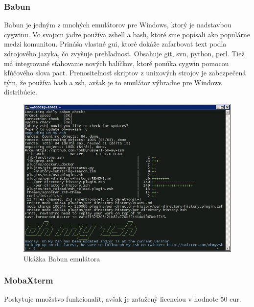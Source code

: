 \subsubsection{Babun}
\indent Babun je jedným z mnohých emulátorov pre Windows, ktorý je nadstavbou cygwinu. Vo svojom jadre používa zshell a bash, ktoré sme popísali ako populárne medzi komunitou. Prináša vlastné \acrshort{gui}, ktoré dokáže zafarbovať text podľa zdrojového jazyka, čo zvyšuje prehľadnosť. Obsahuje git, svn, python, perl. Tiež má integrované sťahovanie nových balíčkov, ktoré ponúka cygwin pomocou kľúčového slova pact. Prenositeľnosť skriptov z unixových strojov je zabezpečená tým, že používa bash a zsh, avšak je to emulátor výhradne pre Windows distribúcie.\cite{babun}
\begin{figure}[!htbp]
	\centering
	\includegraphics[scale=0.4]{img/babun.jpeg}
	\caption{Ukážka Babun emulátora}
	\label{fig:test}
\end{figure}
\subsubsection{MobaXterm}
\indent Poskytuje množstvo funkcionalít, avšak je zaťažený licenciou v hodnote 50 eur. \cite{mobaxterm}
